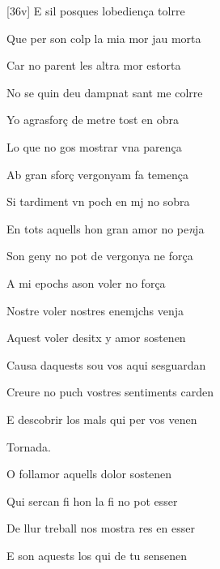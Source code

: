 \documentclass[12pt]{article}
\begin{document}
\begin{estrofa}

 [36v] E sil posques lobedien\c{c}a tolrre

 Que per son colp la mia mor jau morta

 Car no parent les altra mor estorta

 No se quin deu dampnat sant me colrre

 Yo agrasfor\c{c} de metre tost en obra

 Lo que no gos mostrar vna paren\c{c}a

 Ab gran sfor\c{c} vergonyam fa temen\c{c}a

 Si tardiment vn poch en mj no sobra

\end{estrofa}



\begin{estrofa}

 En tots aquells hon gran amor no pe\textit{n}ja

 Son geny no pot de vergonya ne for\c{c}a

 A mi epochs ason voler no for\c{c}a

 Nostre voler nostres enemjchs venja

 Aquest voler desitx y amor sostenen

 Causa daquests sou vos aqui sesguardan

 Creure no puch vostres sentiments carden

 E descobrir los mals qui per vos venen

\end{estrofa}


\begin{estrofaExtra}%




\begin{tornada}

Tornada.\barraInclinada 

\end{tornada}


\end{estrofaExtra}


\begin{estrofa}

 O follamor aquells dolor sostenen

 Qui sercan fi hon la fi no pot esser

 De llur treball nos mostra res en esser

 E son aquests los qui de tu sensenen

\end{estrofa}
\end{document}
